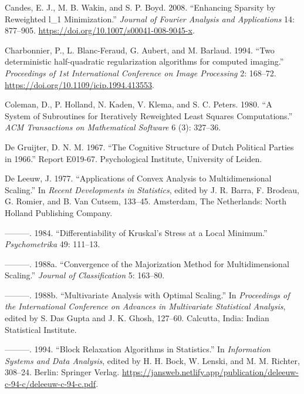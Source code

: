 \documentclass[
  12pt,
  letterpaper,
  DIV=11,
  numbers=noendperiod]{scrartcl}
\newlength{\cslhangindent}
\newenvironment{CSLReferences}[2] %
 {\begin{list}{}{%
  \setlength{\itemindent}{0pt}
  \setlength{\leftmargin}{0pt}
  \setlength{\parsep}{0pt}
  \ifodd #1
   \setlength{\leftmargin}{\cslhangindent}
   \setlength{\itemindent}{-1\cslhangindent}
  \fi
  \setlength{\itemsep}{#2\baselineskip}}}
 {\end{list}}
\theoremstyle{definition}
\theoremstyle{plain}
\theoremstyle{plain}
\theoremstyle{remark}
\begin{document}
\begin{CSLReferences}{1}{0}
Candes, E. J., M. B. Wakin, and S. P. Boyd. 2008. {``Enhancing Sparsity
by Reweighted l\_1 Minimization.''} \emph{Journal of Fourier Analysis
and Applications} 14: 877--905.
\url{https://doi.org/10.1007/s00041-008-9045-x}.

Charbonnier, P., L. Blanc-Feraud, G. Aubert, and M. Barlaud. 1994.
{``{Two deterministic half-quadratic regularization algorithms for
computed imaging}.''} \emph{Proceedings of 1st International Conference
on Image Processing} 2: 168--72.
\url{https://doi.org/10.1109/icip.1994.413553}.

Coleman, D., P. Holland, N. Kaden, V. Klema, and S. C. Peters. 1980.
{``A System of Subroutines for Iteratively Reweighted Least Squares
Computations.''} \emph{ACM Transactions on Mathematical Software} 6 (3):
327--36.

De Gruijter, D. N. M. 1967. {``{The Cognitive Structure of Dutch
Political Parties in 1966}.''} Report E019-67. Psychological Institute,
University of Leiden.

De Leeuw, J. 1977. {``Applications of Convex Analysis to
Multidimensional Scaling.''} In \emph{Recent Developments in
Statistics}, edited by J. R. Barra, F. Brodeau, G. Romier, and B. Van
Cutsem, 133--45. Amsterdam, The Netherlands: North Holland Publishing
Company.

---------. 1984. {``{Differentiability of Kruskal's Stress at a Local
Minimum}.''} \emph{Psychometrika} 49: 111--13.

---------. 1988a. {``Convergence of the Majorization Method for
Multidimensional Scaling.''} \emph{Journal of Classification} 5:
163--80.

---------. 1988b. {``{Multivariate Analysis with Optimal Scaling}.''} In
\emph{Proceedings of the International Conference on Advances in
Multivariate Statistical Analysis}, edited by S. Das Gupta and J. K.
Ghosh, 127--60. Calcutta, India: Indian Statistical Institute.

---------. 1994. {``{Block Relaxation Algorithms in Statistics}.''} In
\emph{Information Systems and Data Analysis}, edited by H. H. Bock, W.
Lenski, and M. M. Richter, 308--24. Berlin: Springer Verlag.
\url{https://jansweb.netlify.app/publication/deleeuw-c-94-c/deleeuw-c-94-c.pdf}.


\end{CSLReferences}
\end{document}
